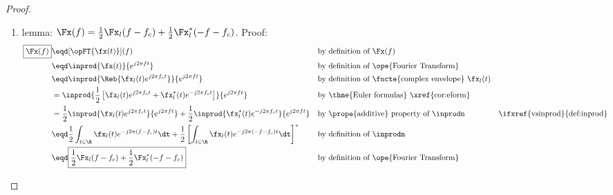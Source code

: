 \begin{proof}
\begin{enumerate}
  \item lemma: $\Fx(f)=\frac{1}{2}\Fx_l(f-f_c) + \frac{1}{2}\Fx_l^\ast(-f-f_c)$. Proof: \label{ilem:xxl}
    \begin{align*}
      \boxed{\Fx(f)}
           &\eqd [\opFT{\fx(t)}](f)
           && \text{by definition of $\Fx(f)$}
         \\&\eqd \inprod{\fx(t)}{e^{j2\pi ft}}
           && \text{by definition of \ope{Fourier Transform}}
         \\&\eqd \inprod{\Reb{ \fx_l(t)e^{j2\pi f_ct}}}
                              {e^{j2\pi ft}}
           && \text{by definition of \fncte{complex envelope} $\fx_l(t)$}
         \\&=    \inprod{\frac{1}{2}\left[ \fx_l(t)e^{j2\pi f_ct} + \fx_l^\ast(t)e^{-j2\pi f_ct}   \right]}
                              {e^{j2\pi ft}}
            && \text{by \thme{Euler formulas} 
                     \xref{cor:eform}}
         \\&=    \frac{1}{2} \inprod{\fx_l(t)     e^{ j2\pi f_ct}}{ e^{j2\pi ft}}
               + \frac{1}{2} \inprod{\fx_l^\ast(t)e^{-j2\pi f_ct}}{ e^{j2\pi ft}}
           && \text{by \prope{additive} property of $\inprodn$}
           && \text{\ifxref{vsinprod}{def:inprod}}
         \\&\eqd \frac{1}{2} \int_{t\in\R}  \fx_l(t)e^{-j2\pi(f-f_c)t} \dt
            +    \frac{1}{2} \left[ \int_{t\in\R}  \fx_l(t) e^{-j2\pi(- f-f_c)t}  \dt \right]^\ast
           && \text{by definition of $\inprodn$}
         \\&\eqd \boxed{\frac{1}{2}\Fx_l(f-f_c) + \frac{1}{2}\Fx_l^\ast(-f-f_c)}
           && \text{by definition of \ope{Fourier Transform}}
    \end{align*}


\end{enumerate}
\end{proof}
